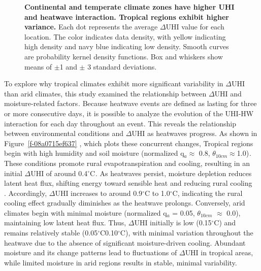 \bgroup
{}
\begin{figure*}[!htbp]
\centering \makeatletter{}
\makeatother 
\caption{{\textbf{Continental and temperate climate zones have higher UHI and heatwave interaction. Tropical regions exhibit higher variance. }Each dot represents the average \ensuremath{\Delta }UHI value for each location. The color indicates data density, with yellow indicating high density and navy blue indicating low density. Smooth curves are probability kernel density functions. Box and whiskers show means of \ensuremath{\pm}1 and \ensuremath{\pm} 3 standard deviations.}}
\label{f-449d024f9ad2}
\end{figure*}
\egroup
To explore why tropical climates exhibit more significant variability in \ensuremath{\Delta }UHI than arid climates, this study examined the relationship between \ensuremath{\Delta }UHI and moisture-related factors\ensuremath{^{}}. Because heatwave events are defined as lasting for three or more consecutive days\ensuremath{^{}}, it is possible to analyze the evolution of the UHI-HW interaction for each day throughout an event. This reveals the relationship between environmental conditions and \ensuremath{\Delta }UHI as heatwaves progress. As shown in Figure~\ref{f-08a0715ef637} , which plots these concurrent changes, Tropical regions begin with high humidity and soil moisture (normalized q\ensuremath{_{a}}\ensuremath{\approx } 0.8, \ensuremath{\theta }\ensuremath{_{10cm}}\noindent \ensuremath{\approx }1.0)\ensuremath{^{}}. These conditions promote rural evapotranspiration and cooling, resulting in an initial \ensuremath{\Delta }UHI of around 0.4\ensuremath{^\circ}C\ensuremath{^{}}. As heatwaves persist, moisture depletion reduces latent heat flux, shifting energy toward sensible heat and reducing rural cooling\unskip~\cite{2755510:33598930,2755510:33598950,2755510:33598927} . Accordingly, \ensuremath{\Delta }UHI increases to around  0.9\ensuremath{^\circ}C to 1.0\ensuremath{^\circ}C, indicating the rural cooling effect gradually diminishes as the heatwave prolongs. Conversely, arid climates begin with minimal moisture (normalized q\ensuremath{_{a}} = 0.05, \ensuremath{\theta }\ensuremath{_{10cm}} \ensuremath{\approx } 0.0), maintaining low latent heat flux. Thus, \ensuremath{\Delta }UHI initially is low ({\texttildeapprox}0.15\ensuremath{^\circ}C) and remains relatively stable (0.05\ensuremath{^\circ}C{\textendash}0.10\ensuremath{^\circ}C), with minimal variation throughout the heatwave due to the absence of significant moisture-driven cooling.  Abundant moisture and its change patterns lead to fluctuations of \ensuremath{\Delta }UHI in tropical areas, while limited moisture in arid regions results in stable, minimal variability.


